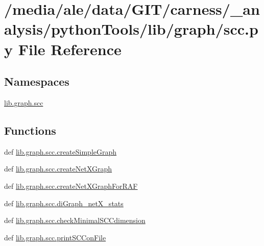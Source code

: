 \hypertarget{a00055}{\section{/media/ale/data/\-G\-I\-T/carness/\-\_\-analysis/python\-Tools/lib/graph/scc.py File Reference}
\label{a00055}
}
\subsection*{Namespaces}
\begin{DoxyCompactItemize}
\item 
\hyperlink{a00111}{lib.\-graph.\-scc}
\end{DoxyCompactItemize}
\subsection*{Functions}
\begin{DoxyCompactItemize}
\item 
def \hyperlink{a00111_a7d0d5fec525d92ca329b1b58da0712be}{lib.\-graph.\-scc.\-create\-Simple\-Graph}
\item 
def \hyperlink{a00111_abc47bb4f5ff50cf5d1dd81c007c1e332}{lib.\-graph.\-scc.\-create\-Net\-X\-Graph}
\item 
def \hyperlink{a00111_aff58b86401d5f04b13100aae79560fe7}{lib.\-graph.\-scc.\-create\-Net\-X\-Graph\-For\-R\-A\-F}
\item 
def \hyperlink{a00111_a98b4189c8603e40d7879d606ed4b215a}{lib.\-graph.\-scc.\-di\-Graph\-\_\-net\-X\-\_\-stats}
\item 
def \hyperlink{a00111_a54bdd154f11152272776a28a4abfcf06}{lib.\-graph.\-scc.\-check\-Minimal\-S\-C\-Cdimension}
\item 
def \hyperlink{a00111_a3dbfb9a21bab7b43f8c634a220af08fc}{lib.\-graph.\-scc.\-print\-S\-C\-Con\-File}
\end{DoxyCompactItemize}
